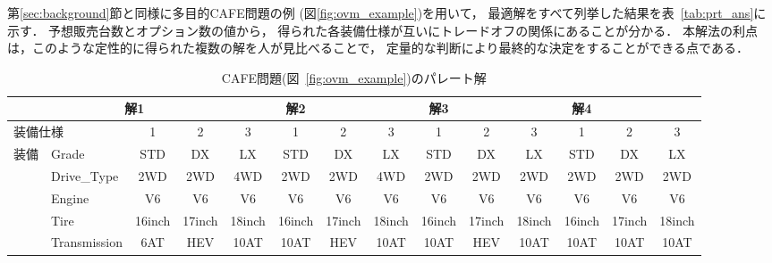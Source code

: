  

第\ref{sec:background}節と同様に多目的CAFE問題の例
(図\ref{fig:ovm_example})を用いて，
最適解をすべて列挙した結果を表~\ref{tab:prt_ans}に示す．
予想販売台数とオプション数の値から，
得られた各装備仕様が互いにトレードオフの関係にあることが分かる．
本解法の利点は，このような定性的に得られた複数の解を人が見比べることで，
定量的な判断により最終的な決定をすることができる点である．

\begin{table*}[t]
   \centering
 \tabcolsep=1mm
  \caption{CAFE問題(図~\ref{fig:ovm_example})のパレート解}
  \begin{tabular}{l|l|c|c|c||c|c|c||c|c|c||c|c|c} \bhline
   \multicolumn{2}{l|}{} & \multicolumn{3}{c||}{解1} & \multicolumn{3}{c||}{解2} & \multicolumn{3}{c||}{解3} & \multicolumn{3}{c}{解4}\\ \hline
   \multicolumn{2}{l|}{装備仕様} & 1 & 2 & 3 & 1 & 2 & 3 & 1 & 2 & 3 & 1 & 2 & 3 \\ \hline
   装備 & \textsf{Grade} & \textsf{STD} & \textsf{DX} & \textsf{LX} & \textsf{STD} & \textsf{DX} & \textsf{LX} & \textsf{STD} & \textsf{DX} & \textsf{LX} & \textsf{STD} & \textsf{DX} & \textsf{LX} \\
       & \textsf{Drive\_Type} & \textsf{2WD} & \textsf{2WD} & \textsf{4WD} & \textsf{2WD} & \textsf{2WD} & \textsf{4WD} & \textsf{2WD} & \textsf{2WD} & \textsf{2WD} & \textsf{2WD} & \textsf{2WD} & \textsf{2WD} \\
       & \textsf{Engine} & \textsf{V6} & \textsf{V6} & \textsf{V6} & \textsf{V6} & \textsf{V6} & \textsf{V6} & \textsf{V6} & \textsf{V6} & \textsf{V6} & \textsf{V6} & \textsf{V6} & \textsf{V6} \\
       & \textsf{Tire} & \textsf{16inch} & \textsf{17inch} & \textsf{18inch} & \textsf{16inch} & \textsf{17inch} & \textsf{18inch} & \textsf{16inch} & \textsf{17inch} & \textsf{18inch} & \textsf{16inch} & \textsf{17inch} & \textsf{18inch} \\
       & \textsf{Transmission} & \textsf{6AT} & \textsf{HEV} & \textsf{10AT} & \textsf{10AT} & \textsf{HEV} & \textsf{10AT} & \textsf{10AT} & \textsf{HEV} & \textsf{10AT} & \textsf{10AT} & \textsf{10AT} & \textsf{10AT} \\

\end{tabular}
\end{table*}
